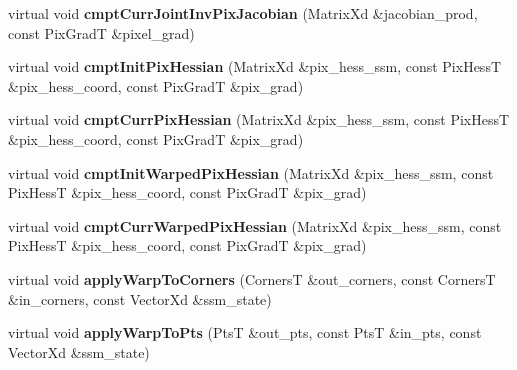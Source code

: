 \begin{DoxyCompactItemize}
\item 
\hypertarget{classStateSpaceModel_af3700561116611a90c9bd62116f9f964}{virtual void {\bfseries cmpt\-Curr\-Joint\-Inv\-Pix\-Jacobian} (Matrix\-Xd \&jacobian\-\_\-prod, const Pix\-Grad\-T \&pixel\-\_\-grad)}\label{classStateSpaceModel_af3700561116611a90c9bd62116f9f964}

\item 
\hypertarget{classStateSpaceModel_ace3041e8376c3cdb9b639975017840ca}{virtual void {\bfseries cmpt\-Init\-Pix\-Hessian} (Matrix\-Xd \&pix\-\_\-hess\-\_\-ssm, const Pix\-Hess\-T \&pix\-\_\-hess\-\_\-coord, const Pix\-Grad\-T \&pix\-\_\-grad)}\label{classStateSpaceModel_ace3041e8376c3cdb9b639975017840ca}

\item 
\hypertarget{classStateSpaceModel_a55ce9ddbc2721dd1f78c0f8327a8f6b9}{virtual void {\bfseries cmpt\-Curr\-Pix\-Hessian} (Matrix\-Xd \&pix\-\_\-hess\-\_\-ssm, const Pix\-Hess\-T \&pix\-\_\-hess\-\_\-coord, const Pix\-Grad\-T \&pix\-\_\-grad)}\label{classStateSpaceModel_a55ce9ddbc2721dd1f78c0f8327a8f6b9}

\item 
\hypertarget{classStateSpaceModel_a226dba05502f0c172abb70413d94cd16}{virtual void {\bfseries cmpt\-Init\-Warped\-Pix\-Hessian} (Matrix\-Xd \&pix\-\_\-hess\-\_\-ssm, const Pix\-Hess\-T \&pix\-\_\-hess\-\_\-coord, const Pix\-Grad\-T \&pix\-\_\-grad)}\label{classStateSpaceModel_a226dba05502f0c172abb70413d94cd16}

\item 
\hypertarget{classStateSpaceModel_aafeacf7584bf65b0f792e60379e33f14}{virtual void {\bfseries cmpt\-Curr\-Warped\-Pix\-Hessian} (Matrix\-Xd \&pix\-\_\-hess\-\_\-ssm, const Pix\-Hess\-T \&pix\-\_\-hess\-\_\-coord, const Pix\-Grad\-T \&pix\-\_\-grad)}\label{classStateSpaceModel_aafeacf7584bf65b0f792e60379e33f14}

\item 
\hypertarget{classStateSpaceModel_a9cfb7407a0293d3b04e0c4e661045aaf}{virtual void {\bfseries apply\-Warp\-To\-Corners} (Corners\-T \&out\-\_\-corners, const Corners\-T \&in\-\_\-corners, const Vector\-Xd \&ssm\-\_\-state)}\label{classStateSpaceModel_a9cfb7407a0293d3b04e0c4e661045aaf}

\item 
\hypertarget{classStateSpaceModel_a8706d6bd58546ef6d4958b6751e506fa}{virtual void {\bfseries apply\-Warp\-To\-Pts} (Pts\-T \&out\-\_\-pts, const Pts\-T \&in\-\_\-pts, const Vector\-Xd \&ssm\-\_\-state)}\label{classStateSpaceModel_a8706d6bd58546ef6d4958b6751e506fa}


\end{DoxyCompactItemize}
